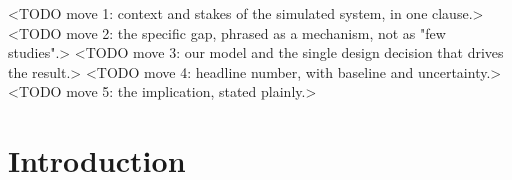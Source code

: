 \documentclass[10pt]{article}
\begin{document}


\begin{csfabstract}
<TODO move 1: context and stakes of the simulated system, in one clause.>
<TODO move 2: the specific gap, phrased as a mechanism, not as "few studies".>
<TODO move 3: our model and the single design decision that drives the result.>
<TODO move 4: headline number, with baseline and uncertainty.>
<TODO move 5: the implication, stated plainly.>

\end{csfabstract}

\section{Introduction}
%
%
\end{document}
